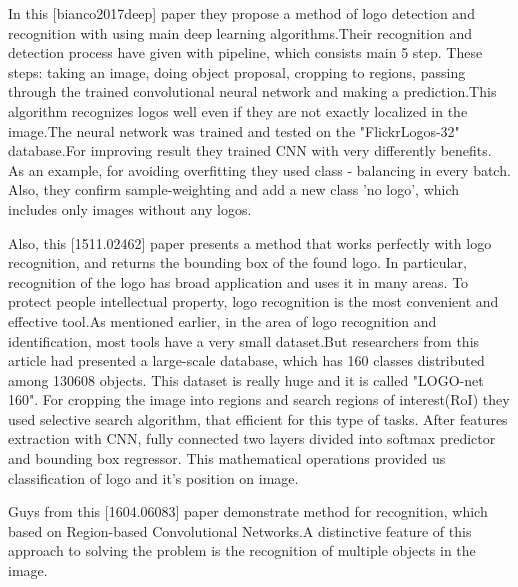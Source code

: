 \vspace{-0.3cm}
\par In this [bianco2017deep] paper they propose a method of logo detection and recognition with using main deep learning algorithms.Their recognition and detection process have given with pipeline, which consists main 5 step. These steps: taking an image, doing object proposal, cropping to regions, passing through the trained convolutional neural network and making a prediction.This algorithm recognizes logos well even if they are not exactly localized in the image.The neural network was trained and tested on the "FlickrLogos-32" database.For improving result they trained CNN with very differently benefits. As an example, for avoiding overfitting they used class - balancing in every batch. Also, they confirm sample-weighting and add a new class  'no logo', which includes only images without any logos.



\vspace{-0.3cm}

\par Also, this [1511.02462] paper presents a method that works perfectly with logo recognition, and returns the bounding box of the found logo. In particular, recognition of the logo has broad application and uses it in many areas. To protect people intellectual property, logo recognition is the most convenient and effective tool.As mentioned earlier, in the area of logo recognition and identification, most tools have a very small dataset.But researchers from this article had presented a large-scale database, which has 160 classes distributed among 130608 objects. This dataset is really huge and it is called "LOGO-net 160". For cropping the image into regions and search regions of interest(RoI) they used selective search algorithm, that efficient for this type of tasks. After features extraction with CNN, fully connected two layers divided into softmax predictor and bounding box regressor. This mathematical operations provided us classification of logo and it's position on image.



\vspace{-0.3cm}

\par Guys from this [1604.06083] paper demonstrate method for recognition, which based on Region-based Convolutional Networks.A distinctive feature of this approach to solving the problem is the recognition of multiple objects in the image.

\vspace{-0.5cm}
